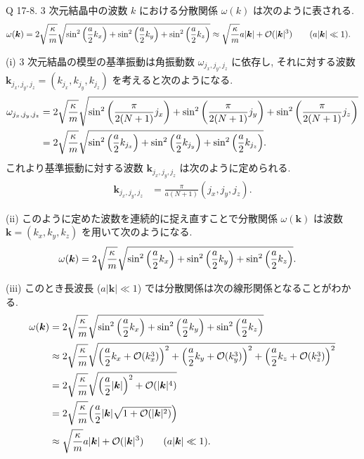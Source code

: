 \documentclass[uplatex,dvipdfmx,a4paper,11pt]{jlreq}
\theoremstyle{definition}
\begin{document}
\begin{itembox}[l]{Q 17-8.}
  3 次元結晶中の波数 $k$ における分散関係 $\omega(k)$ は次のように表される.
  \begin{align}
    \omega(\bm{k}) & = 2\sqrt{\frac{\kappa}{m}}\sqrt{\sin^2\qty(\frac{a}{2}k_x) + \sin^2\qty(\frac{a}{2}k_y) + \sin^2\qty(\frac{a}{2}k_z)} \approx \sqrt{\frac{\kappa}{m}}a|\bm{k}| + \mathcal{O}(|\bm{k}|^3) \qquad (a|\bm{k}| \ll 1).
  \end{align}
\end{itembox}

(i) 3 次元結晶の模型の基準振動は角振動数 $\omega_{j_x,j_y,j_z}$ に依存し, それに対する波数 $\bm{k}_{j_x,j_y,j_z} = (k_{j_x}, k_{j_y}, k_{j_z})$ を考えると次のようになる.
\begin{align}
  \omega_{j_x,j_y,j_z} & = 2\sqrt{\frac{\kappa}{m}}\sqrt{\sin^2\qty(\frac{\pi}{2(N+1)}j_x) + \sin^2\qty(\frac{\pi}{2(N+1)}j_y) + \sin^2\qty(\frac{\pi}{2(N+1)}j_z)} \\
                       & = 2\sqrt{\frac{\kappa}{m}}\sqrt{\sin^2\qty(\frac{a}{2}k_{j_x}) + \sin^2\qty(\frac{a}{2}k_{j_y}) + \sin^2\qty(\frac{a}{2}k_{j_z})}.
\end{align}
これより基準振動に対する波数 $\bm{k}_{j_x,j_y,j_z}$ は次のように定められる.
\begin{align}
  \bm{k}_{j_x,j_y,j_z} & = \frac{\pi}{a(N+1)}(j_x,j_y,j_z).
\end{align}

(ii) このように定めた波数を連続的に捉え直すことで分散関係 $\omega(\bm{k})$ は波数 $\bm{k} = (k_x, k_y, k_z)$ を用いて次のようになる.
\begin{align}
  \omega(\bm{k}) & = 2\sqrt{\frac{\kappa}{m}}\sqrt{\sin^2\qty(\frac{a}{2}k_x) + \sin^2\qty(\frac{a}{2}k_y) + \sin^2\qty(\frac{a}{2}k_z)}.
\end{align}

(iii) このとき長波長 ($a|\bm{k}| \ll 1$) では分散関係は次の線形関係となることがわかる.
\begin{align}
  \omega(\bm{k}) & = 2\sqrt{\frac{\kappa}{m}}\sqrt{\sin^2\qty(\frac{a}{2}k_x) + \sin^2\qty(\frac{a}{2}k_y) + \sin^2\qty(\frac{a}{2}k_z)}                                                          \\
                 & \approx 2\sqrt{\frac{\kappa}{m}}\sqrt{\qty(\frac{a}{2}k_x + \mathcal{O}(k_x^3))^2 + \qty(\frac{a}{2}k_y + \mathcal{O}(k_y^3))^2 + \qty(\frac{a}{2}k_z + \mathcal{O}(k_z^3))^2} \\
                 & = 2\sqrt{\frac{\kappa}{m}}\sqrt{\qty(\frac{a}{2}|\bm{k}|)^2 + \mathcal{O}(|\bm{k}|^4)}                                                                                         \\
                 & = 2\sqrt{\frac{\kappa}{m}}\qty(\frac{a}{2}|\bm{k}|\sqrt{1 + \mathcal{O}(|\bm{k}|^2)})                                                                                          \\
                 & \approx \sqrt{\frac{\kappa}{m}}a|\bm{k}| + \mathcal{O}(|\bm{k}|^3) \qquad (a|\bm{k}| \ll 1).
\end{align}
\end{document}

